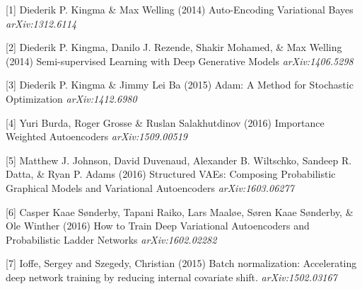 \documentclass{article} %
\begin{document}
\small{
[1] Diederik P. Kingma \& Max Welling (2014) Auto-Encoding Variational Bayes {\it arXiv:1312.6114}

[2] Diederik P. Kingma, Danilo J. Rezende, Shakir Mohamed, \& Max Welling (2014) Semi-supervised Learning with Deep Generative Models {\it arXiv:1406.5298}

[3] Diederik P. Kingma \& Jimmy Lei Ba (2015) Adam: A Method for Stochastic Optimization {\it arXiv:1412.6980}

[4] Yuri Burda, Roger Grosse \& Ruslan Salakhutdinov (2016) Importance Weighted Autoencoders {\it arXiv:1509.00519}

[5] Matthew J. Johnson, David Duvenaud, Alexander B. Wiltschko, Sandeep R. Datta, \& Ryan P. Adams (2016) Structured VAEs: Composing Probabilistic Graphical Models and Variational Autoencoders {\it arXiv:1603.06277}

[6] Casper Kaae Sønderby, Tapani Raiko, Lars Maaløe, Søren Kaae Sønderby, \& Ole Winther (2016) How to Train Deep Variational Autoencoders and Probabilistic Ladder Networks {\it arXiv:1602.02282}

[7] Ioffe, Sergey and Szegedy, Christian (2015) Batch normalization: Accelerating deep network training by reducing internal covariate shift. {\it arXiv:1502.03167}
}
\end{document}
